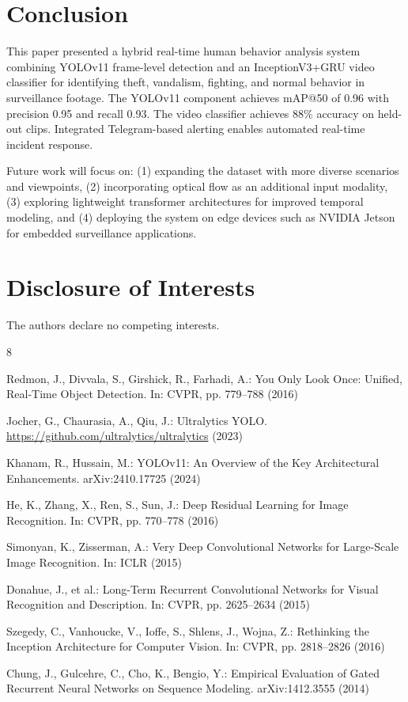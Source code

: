 \documentclass[runningheads]{llncs}
\begin{document}
\section{Conclusion}
\label{sec:conclusion}

This paper presented a hybrid real-time human behavior analysis system combining YOLOv11 frame-level detection and an InceptionV3+GRU video classifier for identifying theft, vandalism, fighting, and normal behavior in surveillance footage. The YOLOv11 component achieves mAP@50 of 0.96 with precision 0.95 and recall 0.93. The video classifier achieves 88\% accuracy on held-out clips. Integrated Telegram-based alerting enables automated real-time incident response.

Future work will focus on: (1) expanding the dataset with more diverse scenarios and viewpoints, (2) incorporating optical flow as an additional input modality, (3) exploring lightweight transformer architectures for improved temporal modeling, and (4) deploying the system on edge devices such as NVIDIA Jetson for embedded surveillance applications.

\section*{Disclosure of Interests}

The authors declare no competing interests.

\begin{thebibliography}{8}

Redmon, J., Divvala, S., Girshick, R., Farhadi, A.: You Only Look Once: Unified, Real-Time Object Detection. In: CVPR, pp. 779--788 (2016)

Jocher, G., Chaurasia, A., Qiu, J.: Ultralytics YOLO. \url{https://github.com/ultralytics/ultralytics} (2023)

Khanam, R., Hussain, M.: YOLOv11: An Overview of the Key Architectural Enhancements. arXiv:2410.17725 (2024)

He, K., Zhang, X., Ren, S., Sun, J.: Deep Residual Learning for Image Recognition. In: CVPR, pp. 770--778 (2016)

Simonyan, K., Zisserman, A.: Very Deep Convolutional Networks for Large-Scale Image Recognition. In: ICLR (2015)

Donahue, J., et al.: Long-Term Recurrent Convolutional Networks for Visual Recognition and Description. In: CVPR, pp. 2625--2634 (2015)

Szegedy, C., Vanhoucke, V., Ioffe, S., Shlens, J., Wojna, Z.: Rethinking the Inception Architecture for Computer Vision. In: CVPR, pp. 2818--2826 (2016)

Chung, J., Gulcehre, C., Cho, K., Bengio, Y.: Empirical Evaluation of Gated Recurrent Neural Networks on Sequence Modeling. arXiv:1412.3555 (2014)

\end{thebibliography}
\end{document}
